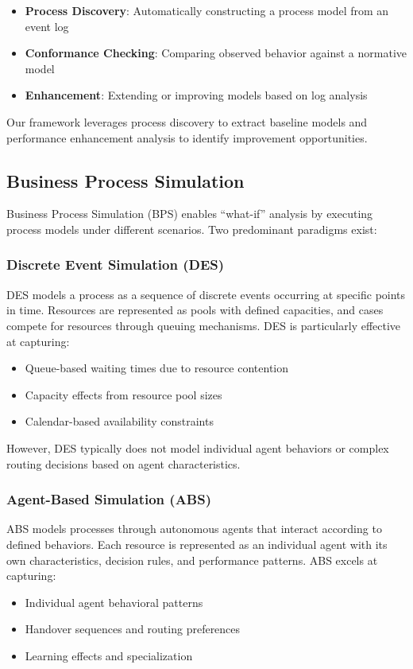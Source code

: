 \documentclass[preprint,12pt]{elsarticle}
\begin{document}
\begin{itemize}
    \item \textbf{Process Discovery}: Automatically constructing a process model from an event log
    \item \textbf{Conformance Checking}: Comparing observed behavior against a normative model
    \item \textbf{Enhancement}: Extending or improving models based on log analysis
\end{itemize}

Our framework leverages process discovery to extract baseline models and performance enhancement analysis to identify improvement opportunities.

\subsection{Business Process Simulation}

Business Process Simulation (BPS) enables ``what-if'' analysis by executing process models under different scenarios. Two predominant paradigms exist:

\subsubsection{Discrete Event Simulation (DES)}

DES models a process as a sequence of discrete events occurring at specific points in time. Resources are represented as pools with defined capacities, and cases compete for resources through queuing mechanisms. DES is particularly effective at capturing:
\begin{itemize}
    \item Queue-based waiting times due to resource contention
    \item Capacity effects from resource pool sizes
    \item Calendar-based availability constraints
\end{itemize}

However, DES typically does not model individual agent behaviors or complex routing decisions based on agent characteristics.

\subsubsection{Agent-Based Simulation (ABS)}

ABS models processes through autonomous agents that interact according to defined behaviors. Each resource is represented as an individual agent with its own characteristics, decision rules, and performance patterns. ABS excels at capturing:
\begin{itemize}
    \item Individual agent behavioral patterns
    \item Handover sequences and routing preferences
    \item Learning effects and specialization
\end{itemize}
\end{document}
